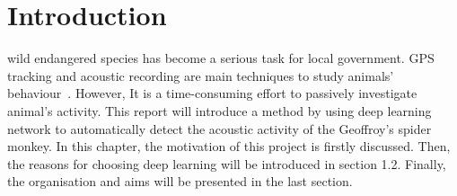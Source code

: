 \chapter{Introduction}
\renewcommand{\baselinestretch}{\mystretch}
\label{chap:Intro}
 wild endangered species has become a serious task for local government. GPS tracking and acoustic recording are main techniques to study animals' behaviour~\cite{sueur2012global}. However, It is a time-consuming effort to passively investigate animal's activity.
This report will introduce a method by using deep learning network to automatically detect the acoustic activity of the Geoffroy’s spider monkey. In this chapter, the motivation of this project is firstly discussed. Then, the reasons for choosing deep learning will be introduced in section 1.2. Finally, the organisation and aims will be presented in the last section.
